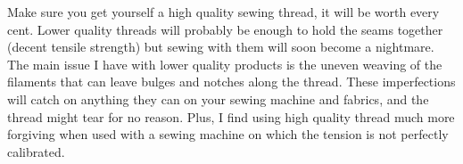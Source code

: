 

Make sure you get yourself a high quality sewing thread, it will be worth every cent. Lower quality threads will probably be enough to hold the seams together (decent tensile strength) but sewing with them will soon become a nightmare. The main issue I have with lower quality products is the uneven weaving of the filaments that can leave bulges and notches along the thread. These imperfections will catch on anything they can on your sewing machine and fabrics, and the thread might tear for no reason. Plus, I find using high quality thread much more forgiving when used with a sewing machine on which the tension is not perfectly calibrated.
